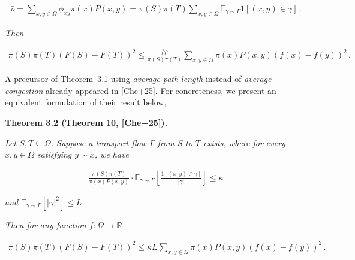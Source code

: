 \[\begin{gathered}
\bar{\rho}=\sum_{x,y\in\Omega}\phi_{xy}\pi(x)P(x,y)=\pi(S)\pi(T)\sum_{x,y\in\Omega}\mathbb{E}_{\gamma\sim\Gamma}1[(x,y)\in\gamma]\,.
\end{gathered}\]




\emph{Then}\par


\[\begin{gathered}
\pi(S)\pi(T)(F(S)-F(T))^{2}\leq\frac{\bar{\rho}\rho}{\pi(S)\pi(T)}\sum_{x,y\in\Omega}\pi(x)P(x,y)(f(x)-f(y))^{2}\,.
\end{gathered}\]






A precursor of Theorem 3.1 using \emph{average path length} instead of \emph{average congestion} already appeared in [Che+25]. For concreteness, we present an equivalent formulation of their result below,\par





\par\medskip\noindent\textbf{\textbf{Theorem 3.2}\textbf{ }(Theorem 10, [Che+25])\textbf{.}}\par



\emph{Let $S,T\subseteq\Omega$. Suppose a transport flow $\Gamma$ from $S$ to $T$ exists, where for every $x,y\in\Omega$ satisfying $y\sim x$, we have}\par


\[\begin{gathered}
\frac{\pi(S)\pi(T)}{\pi(x)P(x,y)}\cdot\mathbb{E}_{\gamma\sim\Gamma}\left[\frac{1[(x,y)\in\gamma]}{|\gamma|}\right]\leq\kappa
\end{gathered}\]


\emph{and $\mathbb{E}_{\gamma\sim\Gamma}\left[|\gamma|^{2}\right]\leq L$.}\par




\emph{Then for any function $f:\Omega\rightarrow\mathbb{R}$}\par


\[\begin{gathered}
\pi(S)\pi(T)(F(S)-F(T))^{2}\leq\kappa L\sum_{x,y\in\Omega}\pi(x)P(x,y)(f(x)-f(y))^{2}\,.
\end{gathered}\]



